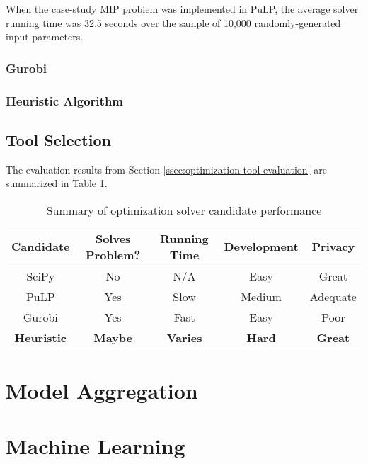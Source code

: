 \documentclass[../mthe-493-final-project.tex]{subfiles}
\begin{document}
    When the case-study MIP problem was implemented in PuLP, the average solver running time was 32.5 seconds over the sample of 10,000 randomly-generated input parameters.
    
    \subsubsection{Gurobi}
    \label{sssec:optimization-candidate-gurobi}
    
    
    
    \subsubsection{Heuristic Algorithm}
    \label{sssec:optimization-candidate-heuristic}
    
    \subsection{Tool Selection}
    \label{ssec:optimization-tool-selection}
    
    The evaluation results from Section \ref{ssec:optimization-tool-evaluation} are summarized in Table \ref{tab:optimization-tool-summary}.
    
    \begin{center}
    \begin{table}
    \begin{tabular}{| c || c c c c |}
        \hline
        Candidate & Solves Problem? & Running Time & Development & Privacy \\ [0.5ex] 
        \hline\hline
        SciPy & No & N/A & Easy & Great \\ 
        \hline
        PuLP & Yes & Slow & Medium & Adequate \\
        \hline
        Gurobi & Yes & Fast & Easy & Poor \\
        \hline
        \textbf{Heuristic} & \textbf{Maybe} & \textbf{Varies} & \textbf{Hard} & \textbf{Great} \\
        \hline
    \end{tabular}
    \caption{\label{tab:optimization-tool-summary}Summary of optimization solver candidate performance}
    \end{table}
    \end{center}
    
    \section{Model Aggregation}
    \label{sec:model-aggregation-engineering-tools}
    
    \section{Machine Learning}
    \label{sec:machine-learning-engineering-tools}
    
    
\end{document}
